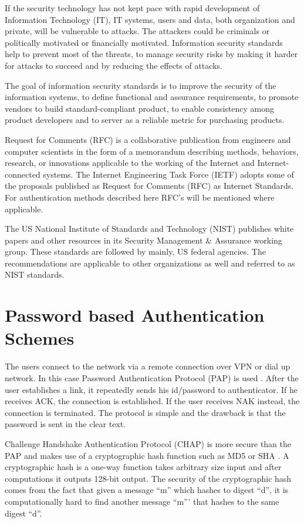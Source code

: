 \begin{multicols}{2}
If the security technology has not kept pace with rapid development of Information Technology (IT), IT systems, users and data, both organization and private, will be vulnerable to attacks. The attackers could be criminals or politically motivated or financially motivated. Information security standards help to prevent most of the threats, to manage security risks by making it harder for attacks to succeed and by reducing the effects of attacks.

The goal of information security standards is to improve the security of the information systems, to define functional and assurance requirements, to promote vendors to build standard-compliant product, to enable consistency among product developers and to server as a reliable metric for purchasing products.

Request for Comments (RFC) is a collaborative publication from engineers and computer scientists in the form of a memorandum describing methods, behaviors, research, or innovations applicable to the working of the Internet and Internet-connected systems. The Internet Engineering Task Force (IETF) adopts some of the proposals published as Request for Comments (RFC) as Internet Standards. For authentication methods described here RFC's will be mentioned where applicable.

The US National Institute of Standards and Technology (NIST) publishes white papers and other resources in its Security Management \& Assurance working group. These standards are followed by mainly, US federal agencies. The recommendations are applicable to other organizations as well and referred to as NIST standards.

\section*{Password based Authentication Schemes}

The users connect to the network via a remote connection over VPN or dial up network. In this case Password Authentication Protocol (PAP) is used \cite{chap2-key4}. After the user establishes a link, it repeatedly sends his id/password to authenticator. If he receives ACK, the connection is established. If the user receives NAK instead, the connection is terminated. The protocol is simple and the drawback is that the password is sent in the clear text.

Challenge Handshake Authentication Protocol (CHAP) is more secure than the PAP and makes use of a cryptographic hash function such as MD5 or SHA \cite{chap2-key1}. A cryptographic hash is a one-way function takes arbitrary size input and after computations it outputs 128-bit output. The security of the cryptographic hash comes from the fact that given a message ``m'' which hashes to digest ``d'', it is computationally hard to find another message ``m''' that hashes to the same digest ``d''.


\end{multicols}
